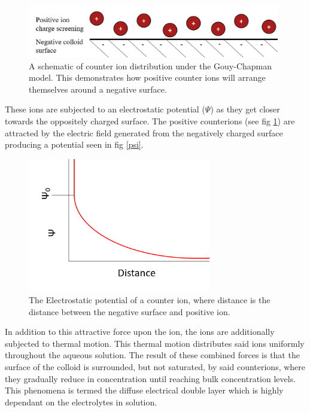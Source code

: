 \begin{figure}[h]    
        \begin{center}
          \includegraphics[width=110mm]{chapter1/ioncloud.PNG}
\end{center}
\caption{A schematic of counter ion distribution under the Gouy-Chapman model. This demonstrates how positive counter ions will arrange themselves around a negative surface.}
\label{fig:ioncloud}                
\end{figure}

These ions are subjected to an electrostatic potential ($\Psi$) as they get closer towards the oppositely charged surface. The positive counterions (see fig \ref{fig:ioncloud}) are attracted by the electric field generated from the negatively charged surface producing a potential seen in fig \ref{psi}. 

\begin{figure}[h]    
        \begin{center}
          \includegraphics[width=80mm]{chapter1/psi.PNG}
\end{center}
\caption{The Electrostatic potential of a counter ion, where distance is the distance between the negative surface and positive ion.}
\label{fig:psi}                
\end{figure}


In addition to this attractive force upon the ion, the ions are additionally subjected to thermal motion. This thermal motion distributes said ions uniformly throughout the aqueous solution. The result of these combined forces is that the surface of the colloid is surrounded, but not saturated, by said counterions, where they gradually reduce in concentration until reaching bulk concentration levels. This phenomena is termed the diffuse electrical double layer which is highly dependant on the electrolytes in solution.

